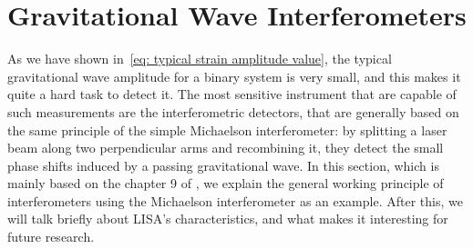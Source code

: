 \section{Gravitational Wave Interferometers}
As we have shown in~\eqref{eq: typical strain amplitude value}, the typical gravitational wave amplitude for a binary system is very small, and this makes it quite a hard task to detect it.
The most sensitive instrument that are capable of such measurements are the interferometric detectors, that are generally based on the same principle of the simple Michaelson interferometer: by splitting a laser beam along two perpendicular arms and recombining it, they detect the small phase shifts induced by a passing gravitational wave.  
In this section, which is mainly based on the chapter 9 of \cite{Maggiore}, we explain the general working principle of interferometers using the Michaelson interferometer as an example.
After this, we will talk briefly about LISA's characteristics, and what makes it interesting for future research.

